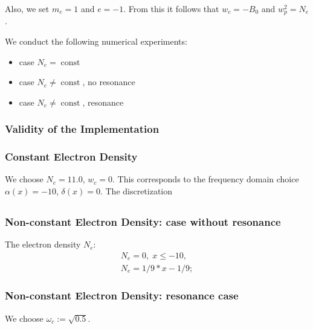 \documentclass[a4paper,10pt]{article}
\begin{document}
Also, we set $m_e=1$ and $e=-1$. From this it follows that $w_c=-B_0$ and $w_p^2=N_e$. 

We conduct the following numerical experiments:
\begin{itemize}
 \item case $N_e=\operatorname{const}$
 \item case $N_e\neq \operatorname{const}$, no resonance
 \item case $N_e\neq \operatorname{const}$, resonance
\end{itemize}

\subsubsection{Validity of  the Implementation}



\subsubsection{}




\subsubsection{Constant Electron Density}
We choose $N_e=11.0$, $w_c=0$. This corresponds to the frequency domain choice $\alpha(x)=-10$, $\delta(x)=0$. 
The discretization 
\begin{align*}
\end{align*}



\subsubsection{Non-constant Electron Density: case without resonance}
The electron density $N_e$:
\begin{align*}
N_e=0,\; x\leq -10,\\
N_e=1/9*x-1/9;
\end{align*}



\subsubsection{Non-constant Electron Density: resonance case}
We choose $\omega_c:=\sqrt{0.5}$.
\end{document}
